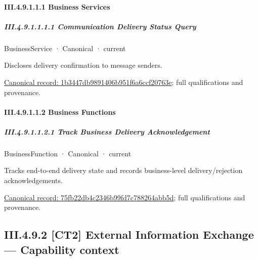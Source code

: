 \paragraph*{III.4.9.1.1.1 Business Services}
\label{navigation:III.4.9.1.1.1}

\subparagraph*{III.4.9.1.1.1.1 Communication Delivery Status Query}
\label{navigation:III.4.9.1.1.1.1}

\label{element:1b3447db9891406b951f6a6ccf20763e}
{\small BusinessService · Canonical · current}\par

Discloses delivery confirmation to message senders.


{\footnotesize \href{../../../../continuum/business/business-service/1b3447db9891406b951f6a6ccf20763e.md}{Canonical record: 1b3447db9891406b951f6a6ccf20763e}; full qualifications and provenance.}\par
\paragraph*{III.4.9.1.1.2 Business Functions}
\label{navigation:III.4.9.1.1.2}

\subparagraph*{III.4.9.1.1.2.1 Track Business Delivery Acknowledgement}
\label{navigation:III.4.9.1.1.2.1}

\label{element:75fb22db4c2346b99fd7c788264abb5d}
{\small BusinessFunction · Canonical · current}\par

Tracks end-to-end delivery state and records business-level delivery/rejection acknowledgements.


{\footnotesize \href{../../../../continuum/business/business-function/75fb22db4c2346b99fd7c788264abb5d.md}{Canonical record: 75fb22db4c2346b99fd7c788264abb5d}; full qualifications and provenance.}\par
\subsection*{III.4.9.2 [CT2] External Information Exchange — Capability context}
\label{navigation:III.4.9.2}

